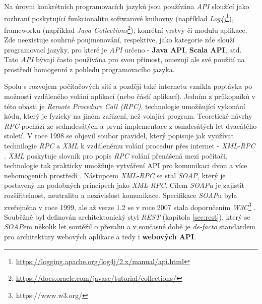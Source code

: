 Na úrovni konkrétních programovacích jazyků jsou používána \textit{API} sloužící jako rozhraní poskytující funkcionalitu softwarové knihovny (například \textit{Log4j}\footnote{\url{https://logging.apache.org/log4j/2.x/manual/api.html}}), frameworku (například \textit{Java Collections}\footnote{\url{https://docs.oracle.com/javase/tutorial/collections/}}), konrétní vrstvy či modulu aplikace. Zde neexistuje souhrné poujmenování, respektive, jako kategorie zde slouží programovací jazyky, pro které je \textit{API} určeno - \textbf{Java API}, \textbf{Scala API}, atd. Tato \textit{API} bývají často používána pro svou přímost, omezují ale své použití na prostředí homogenní z pohledu programovacího jazyka.

Spolu s rozvojem počítačových sítí a později také internetu vznikla poptávka po možnosti vzdáleného volání aplikací (nebo částí aplikací). Jedním z průkopníků v této obasti je \textit{Remote Procedure Call (RPC)}, technologie umožňující vykonání kódu, který je fyzicky na jiném zařízení, než volající program. Teoretické návrhy \textit{RPC} pochází ze sedmdesátých a první implementace z osmdesátých let dvacátého století. V roce 1998 se objevil soubor pravidel, který popisuje jak využívat technilogie \textit{RPC} a \textit{XML} k vzdálenému volání procedur přes internet - \textit{XML-RPC} \cite{Winner99}. \textit{XML} poskytuje slovník pro popis \textit{RPC} volání přenášená mezi počítači, technologie tak prakticky umožňuje vytváření API pro komunikaci dvou a více nehomogeních prostředí \cite{Laurent01}. Nástupcem \textit{XML-RPC} se stal \textit{SOAP}, který je postavený na podobných principech jako \textit{XML-RPC}. Cílem \textit{SOAP}u je zajistit rozšířitelnost, neutralitu a nezávislost komunikace. Specifikace \textit{SOAP}u byla zveřejněna v roce 1999, ale
až verze 1.2 se v roce 2007 stala doporučením \textit{W3C}\footnote{https://www.w3.org/} \cite{W3C07}. Souběžně byl definován architektonický styl \textit{REST} (kapitola \ref{sec:rest}), který se \textit{SOAP}em několik let soutěžil o převahu a v současné době je \textit{de-facto} standardem pro architektury webových aplikace a tedy i \textbf{webových API}.

